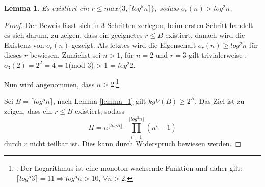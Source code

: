 \documentclass[12pt,oneside]{article}
\newtheorem{lemma}[theorem]{Lemma}
\theoremstyle{remark}
\theoremstyle{definition}
\begin{document}
\smallskip

\begin{lemma}\label{limit_of_r}
Es existiert ein $ r \leq max \{ 3, \lceil log^5 n \rceil \}$, sodass $o_{r}(n) > log^2 n$.
\end{lemma}


\begin{proof}
Der Beweis lässt sich in 3 Schritten zerlegen; beim ersten Schritt handelt es sich darum, zu zeigen, dass ein geeignetes $r \leq B$ existiert, danach wird die Existenz von $o_{r}(n)$ gezeigt. Als letztes wird die Eigenschaft $o_{r}(n) \geq log^2 n$ für dieses $r$ bewiesen.\newline\newline
Zunächst sei $n > 1$, für $n = 2$ und $r = 3$ gilt trivialerweise :\newline\newline $o_{3}(2) = 2^2 = 4 = 1 $(mod 3) > 1 = $log^2 2$.

Nun wird angenommen, dass $n > 2$.\footnote{. Der Logarithmus ist eine monoton wachsende Funktion und daher gilt:\newline $\lceil log^5 3 \rceil = 11 \Rightarrow log^5 n > 10, \,  \forall n > 2$.}\newline\newline

Sei $B = \lceil log^5 n \rceil$, nach Lemma \ref{lemma_1} gilt $kgV(B) \geq 2^B$. Das Ziel ist zu zeigen, dass   ein $r \leq B$ existiert, sodass
\begin{equation}\label{prod_cor}
     \Pi = n^{\lfloor log B \rfloor } \cdot \prod_{i = 1}^{\lfloor log^2 n \rfloor} (n^i - 1)
\end{equation}
durch $r$ nicht teilbar ist. Dies kann durch Widerspruch bewiesen werden.


\end{proof}
\end{document}
